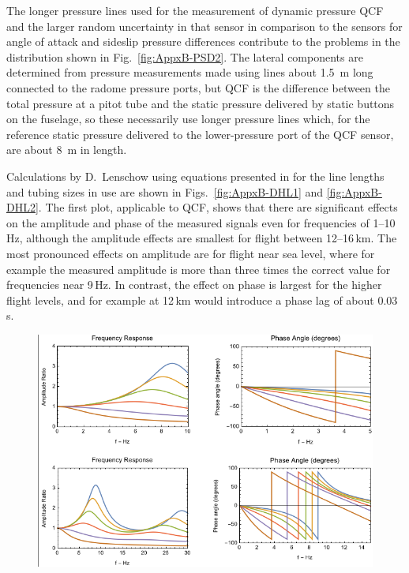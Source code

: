 \documentclass[12pt,twoside,english]{article}\usepackage[]{graphicx}\usepackage[]{color}
\let\OrgIndex\index
\renewcommand*{\index}[1]{\OrgIndex{#1}}
\begin{document}
{{\begin{appendices}
The longer pressure lines used for the measurement of dynamic pressure QCF and the larger random uncertainty in that sensor in comparison to the sensors for angle of attack and sideslip pressure differences contribute to the problems in the distribution shown in Fig.~\ref{fig:AppxB-PSD2}. The lateral components are determined from pressure measurements made using lines about 1.5~m long connected to the radome pressure ports, but QCF is the difference between the total pressure at a pitot tube and the static pressure delivered by static buttons on the fuselage, so these necessarily use longer pressure lines which, for the reference static pressure delivered to the lower-pressure port of the QCF sensor, are about 8~m in length.

Calculations by D.~Lenschow using equations presented in \citet{Iberall1950} for the line lengths and tubing sizes in use are shown in Figs.~\ref{fig:AppxB-DHL1} and \ref{fig:AppxB-DHL2}. The first plot, applicable to QCF, shows that there are significant effects on the amplitude and phase of the measured signals even for frequencies of 1--10\,Hz, although the amplitude effects are smallest for flight between 12--16\,km. The most pronounced effects on amplitude are for flight near sea level, where for example the measured amplitude is more than three times the correct value for frequencies near 9\,Hz. In contrast, the effect on phase is largest for the higher flight levels, and for example at 12\,km would introduce a phase lag of about 0.03\,s. 
\begin{figure}
\noindent \begin{centering}
\includegraphics[height=0.4\textheight]{SpecialGraphics/PressureLines1.png}  
\par\end{centering}


\end{figure}
\end{appendices}}}
\end{document}
